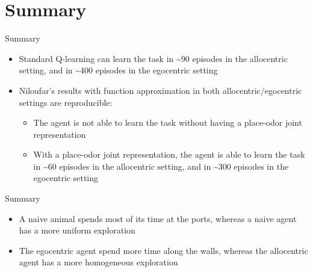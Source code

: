 \documentclass[bigger]{beamer}
\begin{document}
\section{Summary}
\label{sec:org818ea70}
\begin{frame}[<+->][label={sec:org506b906}]{Summary}
\begin{itemize}
\item Standard Q-learning can learn the task in \textasciitilde{}90 episodes in the \alert{allocentric} setting, and in \textasciitilde{}400 episodes in the \alert{egocentric} setting
\item Niloufar's results with function approximation in both allocentric/egocentric settings are \alert{reproducible}:
\begin{itemize}
\item The agent is \alert{not able to learn} the task \alert{without} having a place-odor joint representation
\item \alert{With} a place-odor joint representation, the agent is \alert{able to learn the task} in \textasciitilde{}60 episodes in the allocentric setting, and in \textasciitilde{}300 episodes in the egocentric setting
\end{itemize}
\end{itemize}
\end{frame}
\begin{frame}[<+->][label={sec:org77bf245}]{Summary}
\begin{itemize}
\item A naive \alert{animal} spends most of its time at the ports, whereas a naive \alert{agent} has a more uniform exploration
\item The \alert{egocentric} agent spend more time along the \alert{walls}, whereas the \alert{allocentric} agent has a more \alert{homogeneous} exploration
\end{itemize}
\end{frame}
\end{document}
